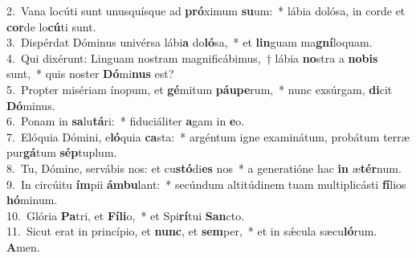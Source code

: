 {2.~}Vana locúti sunt unusquísque ad \textbf{pró}ximum \textbf{su}um:~* lábia dolósa, in corde et \textbf{cor}de lo\textbf{cú}ti sunt.\\
{3.~}Dispérdat Dóminus univérsa lábi\textbf{a} do\textbf{ló}sa,~* et \textbf{lin}guam ma\textbf{gní}loquam.\\
{4.~}Qui dixérunt: Linguam nostram magnificábimus,~† lábia \textbf{no}stra a \textbf{no}\textbf{bis} sunt,~* quis noster \textbf{Dó}mi\textbf{nus} est?\\
{5.~}Propter misériam ínopum, et \textbf{gé}mitum \textbf{páu}\textbf{pe}rum,~* nunc exsúrgam, \textbf{di}cit \textbf{Dó}minus.\\
{6.~}Ponam in \textbf{sa}lu\textbf{tá}ri:~* fiduciáliter \textbf{a}gam in \textbf{e}o.\\
{7.~}Elóquia Dómini, e\textbf{ló}quia \textbf{ca}sta:~* argéntum igne examinátum, probátum terræ pur\textbf{gá}tum \textbf{sép}tuplum.\\
{8.~}Tu, Dómine, servábis nos: et cu\textbf{stó}di\textbf{es} nos~* a generatióne hac \textbf{in} æ\textbf{tér}num.\\
{9.~}In circúitu \textbf{ím}pii \textbf{ám}\textbf{bu}lant:~* secúndum altitúdinem tuam multiplicásti \textbf{fí}lios \textbf{hó}minum.\\
{10.~}Glória \textbf{Pa}tri, et \textbf{Fí}\textbf{li}o,~* et Spi\textbf{rí}tui \textbf{San}cto.\\
{11.~}Sicut erat in princípio, et \textbf{nunc}, et \textbf{sem}per,~* et in sǽcula sæcu\textbf{ló}rum. \textbf{A}men.\\
